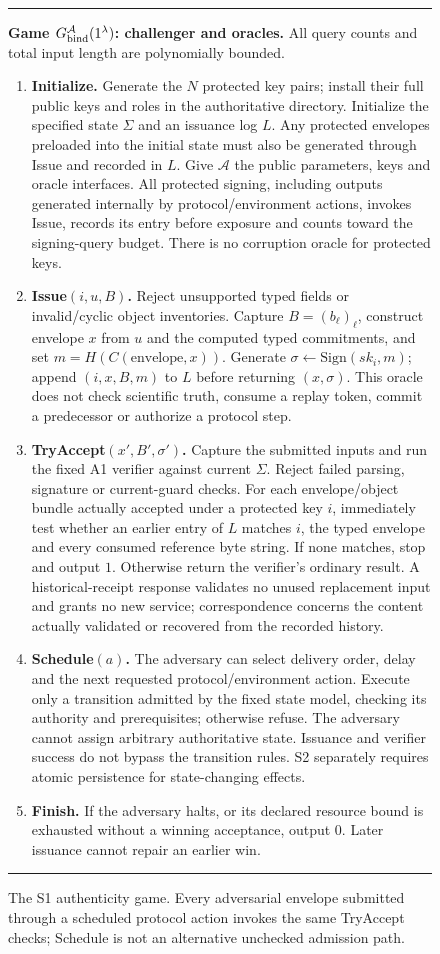 \begin{figure}[t]
\centering
\begin{minipage}{0.97\textwidth}
\hrule\smallskip
\normalsize
\textbf{Game $G_{\rm bind}^{\mathcal A}(1^\lambda)$: challenger and oracles.}
All query counts and total input length are polynomially bounded.
\begin{enumerate}
\item \textbf{Initialize.} Generate the $N$ protected key pairs; install their
full public keys and roles in the authoritative directory. Initialize
the specified state $\Sigma$ and an issuance log $L$. Any protected envelopes
preloaded into the initial state must also be generated through Issue and
recorded in $L$. Give $\mathcal A$ the public parameters, keys and oracle
interfaces. All protected signing, including outputs generated internally
by protocol/environment actions, invokes Issue, records its entry before
exposure and counts toward the signing-query budget. There is no corruption
oracle for protected keys.
\item \textbf{Issue$(i,u,B)$.} Reject unsupported typed fields or invalid/cyclic
object inventories. Capture $B=(b_\ell)_\ell$, construct envelope $x$ from
$u$ and the computed typed commitments, and set
$m=H(C(\mathrm{envelope},x))$.
Generate $\sigma\leftarrow\mathrm{Sign}(sk_i,m)$; append $(i,x,B,m)$ to $L$
before returning $(x,\sigma)$. This oracle does not check scientific truth,
consume a replay token, commit a predecessor or authorize a protocol step.
\item \textbf{TryAccept$(x',B',\sigma')$.} Capture the submitted inputs and
run the fixed A1 verifier against current $\Sigma$. Reject failed parsing,
signature or current-guard checks. For each envelope/object bundle actually
accepted under a protected key $i$, immediately test whether an earlier
entry of $L$ matches $i$, the typed envelope and every consumed reference
byte string. If none matches, stop and output $1$. Otherwise return the
verifier's ordinary result. A historical-receipt response validates no
unused replacement input and grants no new service; correspondence concerns
the content actually validated or recovered from the recorded history.
\item \textbf{Schedule$(a)$.} The adversary can select delivery order, delay
and the next requested protocol/environment action. Execute only a transition
admitted by the fixed state model, checking its authority and prerequisites;
otherwise refuse. The adversary cannot assign arbitrary authoritative state.
Issuance and verifier success do not bypass the transition rules. S2
separately requires atomic persistence for state-changing effects.
\item \textbf{Finish.} If the adversary halts, or its declared resource bound
is exhausted without a winning acceptance, output $0$. Later issuance cannot
repair an earlier win.
\end{enumerate}
\smallskip\hrule
\end{minipage}
\caption{The S1 authenticity game. Every adversarial envelope submitted through
a scheduled protocol action invokes the same TryAccept checks; Schedule is
not an alternative unchecked admission path.}
\label{fig:binding-game}
\end{figure}

